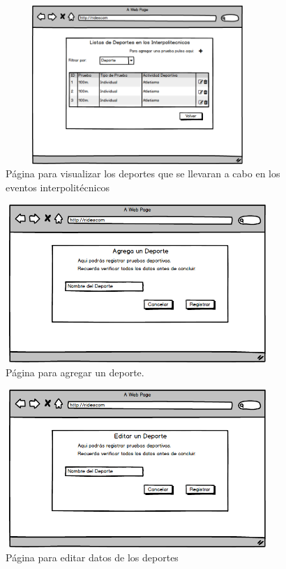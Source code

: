 		\begin{figure} [hbt!]
			\centering
			\includegraphics[width=10cm, height=6cm]{Imagenes/Nuevos/P27_Deportes_JFD}
			\caption{Página para visualizar los deportes que se llevaran a cabo en los eventos interpolitécnicos}
			\label{deportes}
		\end{figure}
	
		\begin{figure} [hbt!]
			\centering
			\includegraphics[width=10cm, height=6cm]{Imagenes/Nuevos/P28_AgregarDeportes_JFD}
			\caption{Página para agregar un deporte.}
			\label{agregadeporte}
		\end{figure}
		
		\begin{figure} [hbt!]
			\centering
			\includegraphics[width=10cm, height=6cm]{Imagenes/Nuevos/P29_EditarDeportes_JFD}
			\caption{Página para editar datos de los deportes}
			\label{editardeporte}
		\end{figure}
		\pagebreak
		
